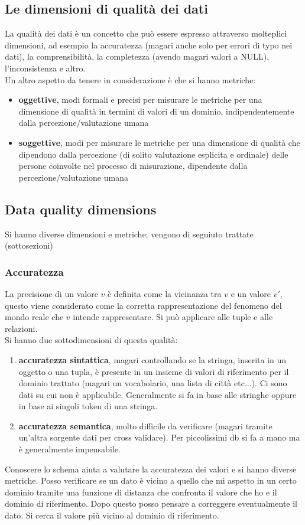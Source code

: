 \subsection{Le dimensioni di qualità dei dati}
La qualità dei dati è un concetto che può essere espresso attraverso molteplici dimensioni, ad esempio la accuratezza (magari anche solo per errori di typo nei dati), la comprensibilità, la completezza (avendo magari valori a NULL), l'inconsistenza e altro.\\

Un altro aspetto da tenere in considerazione è che si hanno metriche:
\begin{itemize}
  \item \textbf{oggettive}, modi formali e precisi per misurare le metriche per una dimensione di qualità in termini di valori di un dominio, indipendentemente dalla percezione/valutazione umana
  \item \textbf{soggettive}, modi per misurare le metriche per una dimensione di qualità che dipendono dalla percezione (di solito valutazione esplicita e ordinale) delle persone coinvolte nel processo di misurazione, dipendente dalla percezione/valutazione umana
\end{itemize}
\subsection{Data quality dimensions}
Si hanno diverse dimensioni e metriche; vengono di seguiuto trattate (sottosezioni)
\subsubsection{Accuratezza}
La precisione di un valore $v$ è definita come la vicinanza tra $v$ e un valore $v'$, questo viene considerato come la corretta rappresentazione del fenomeno del mondo reale che $v$ intende rappresentare. Si può applicare alle tuple e alle relazioni.\\

Si hanno due sottodimensioni di questa qualità:
\begin{enumerate}
  \item \textbf{accuratezza sintattica}, magari controllando se la stringa, inserita in un oggetto o una tupla, è presente in un insieme di valori di riferimento per il dominio trattato (magari un vocabolario, una lista di città etc$\ldots$). Ci sono dati su cui non è applicabile. Generalmente si fa in base alle stringhe oppure in base ai singoli token di una stringa.
  \item \textbf{accuratezza semantica}, molto difficile da verificare (magari tramite un'altra sorgente dati per cross validare). Per piccolissimi db si fa a mano ma è generalmente impensabile. 
\end{enumerate}
Conoscere lo schema aiuta a valutare la accuratezza dei valori e si hanno diverse metriche. Posso verificare se un dato è vicino a quello che mi aspetto in un certo dominio tramite una funzione di distanza che confronta il valore che ho e il dominio di riferimento. Dopo questo posso pensare a correggere eventualmente il dato. Si cerca il valore più vicino al dominio di riferimento.\\

